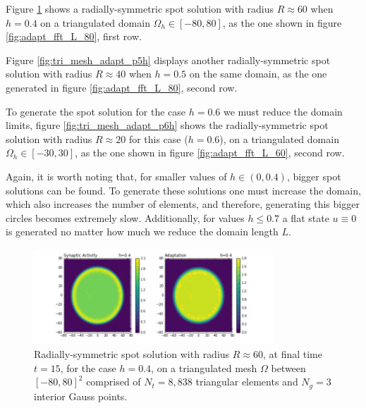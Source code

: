 \documentclass{uonmathreport}
\begin{document}
Figure \ref{fig:tri_mesh_adapt_p4h} shows a radially-symmetric spot solution with radius $R \approx 60$ when $h=0.4$ on a triangulated domain $\Omega_h \in [-80,80]$, as the one shown in figure \ref{fig:adapt_fft_L_80}, first row. 

Figure \ref{fig:tri_mesh_adapt_p5h} displays another radially-symmetric spot solution with radius $R \approx 40$ when $h=0.5$ on the same domain, as the one generated in figure \ref{fig:adapt_fft_L_80}, second row. 

To generate the spot solution for the case $h=0.6$ we must reduce the domain limits, figure \ref{fig:tri_mesh_adapt_p6h} shows the radially-symmetric spot solution with radius $R \approx 20$ for this case ($h=0.6$), on a triangulated domain $\Omega_h \in [-30,30]$, as the one shown in figure \ref{fig:adapt_fft_L_60}, second row. 

Again, it is worth noting that, for smaller values of $h \in (0, 0.4)$, bigger spot solutions can be found. To generate these solutions one must increase the domain, which also increases the number of elements, and therefore, generating this bigger circles becomes extremely slow. Additionally, for values $h \leq 0.7$ a flat state $u \equiv 0$ is generated no matter how much we reduce the domain length $L$.

\begin{figure}
	\begin{center}
		\includegraphics[width=0.8\textwidth]{Figures/Adapt_8838elems_(p4)h.png}
	\end{center}
	\caption{Radially-symmetric spot solution with radius $R\approx 60$, at final time $t=15$, for the case $h=0.4$, on a triangulated mesh $\Omega$ between $[-80,80]^2$ comprised of $N_t=8,838$ triangular elements and $N_g=3$ interior Gauss points.}
	\label{fig:tri_mesh_adapt_p4h}
\end{figure}
\end{document}
